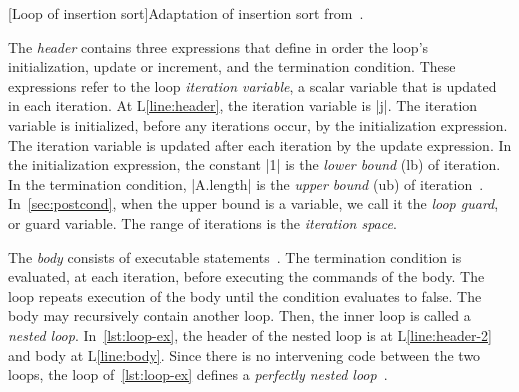 \begin{center}
\begin{minipage}{\textwidth}
[Loop of insertion sort]{Adaptation of insertion sort from~\textcite{cormen2009}.}
\label{lst:loop-ex}
\end{minipage}
\end{center}

The \emph{header} contains three expressions that define in order the loop's initialization, update or increment, and the termination condition.
These expressions refer to the loop \emph{iteration variable}, a scalar variable that is updated in each iteration.
At L\ref{line:header}, the iteration variable is \pr|j|.
The iteration variable is initialized, before any iterations occur, by the initialization expression.
The iteration variable is updated after each iteration by the update expression.
In the initialization expression, the constant \pr|1| is the \emph{lower bound} (lb) of iteration.
In the termination condition, \pr|A.length| is the \emph{upper bound} (ub) of iteration~\cite[p. 198--199]{openmp_api}.
In~\autoref{sec:postcond}, when the upper bound is a variable, we call it the \emph{loop guard}, or {guard variable}.
The range of iterations is the \emph{iteration space}.

The \emph{body} consists of executable statements~\cite[p. 67]{openmp_api}.
The termination condition is evaluated, at each iteration, before executing the commands of the body.
The loop repeats execution of the body until the condition evaluates to false.
The body may recursively contain another loop.
Then, the inner loop is called a \emph{nested loop}.
In~\autoref{lst:loop-ex}, the header of the nested loop is at L\ref{line:header-2} and body at L\ref{line:body}.
Since there is no intervening code between the two loops, the loop of~\autoref{lst:loop-ex} defines a \emph{perfectly nested loop}~\cite[p. 84]{openmp_api}.

